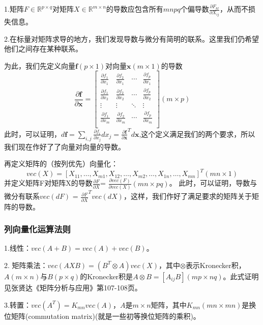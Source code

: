 \documentclass[UTF8]{ctexart}
\begin{document}
		1.矩阵$F\in \mathbb{R}^{p \times q}$对矩阵$X\in \mathbb{R}^{m \times n}$的导数应包含所有$mnpq$个偏导数$\frac{\partial F_{kl}}{\partial X_{ij}}$，从而不损失信息。

		2.在标量对矩阵求导的地方，我们发现导数与微分有简明的联系。这里我们仍希望他们之间存在某种联系。

		为此，我们先定义向量$\boldsymbol{f}(p×1)$对向量$\boldsymbol{x}(m×1)$的导数
		$$\frac{\partial \boldsymbol{f}}{\partial \boldsymbol{x}} 
		= 
		\begin{bmatrix} 
		\frac{\partial f_1}{\partial x_1} & \frac{\partial f_2}{\partial x_1} & \cdots & \frac{\partial f_p}{\partial x_1}\\ 
		\frac{\partial f_1}{\partial x_2} & \frac{\partial f_2}{\partial x_2} & \cdots & \frac{\partial f_p}{\partial x_2}\\ 
		\vdots & \vdots & \ddots & \vdots\\ 
		\frac{\partial f_1}{\partial x_m} & \frac{\partial f_2}{\partial x_m} & \cdots & \frac{\partial f_p}{\partial x_m}\\ 
		\end{bmatrix}(m×p)$$
		此时，可以证明，$d\boldsymbol{f} = \sum\limits_{i,j}\frac{\partial f_{i}}{\partial x_{j}} dx_{j} =
		\frac{\partial \boldsymbol{f} }{\partial \boldsymbol{x} }^T d\boldsymbol{x}$,这个定义满足我们的两个要求，所以我们现在作好了了向量对向量的导数。

		再定义矩阵的（按列优先）向量化：
		$${vec}(X) = [X_{11}, \ldots, X_{m1}, X_{12}, \ldots, X_{m2}, \ldots, X_{1n}, \ldots, X_{mn}]^T(mn×1)$$
		并定义矩阵F对矩阵X的导数$\frac{\partial F}{\partial X} $= $\frac{\partial {vec}(F)}{\partial {vec}(X)}(mn×pq)$。
		此时，可以证明，导数与微分有联系${vec}(dF)$ = $\frac{\partial F}{\partial X}^T {vec}(dX)$，这样，我们作好了满足要求的矩阵关于矩阵的导数。

		\subsubsection*{列向量化运算法则}

		1.线性：${vec}(A+B) = {vec}(A) + {vec}(B)$。
		
		2.{\color{red} 矩阵乘法}：${vec}(AXB) = (B^T \otimes A) {vec}(X)$，其中$\otimes$表示Kronecker积，$A(m×n)与B(p×q)$的Kronecker积是$A\otimes B = [A_{ij}B](mp×nq)$。此式证明见张贤达《矩阵分析与应用》第107-108页。
		
		3.转置：${vec}(A^T) = K_{mn}{vec}(A)$，$A$是$m×n$矩阵，其中$K_{mn}(mn×mn)$是换位矩阵(commutation matrix)(就是一些初等换位矩阵的乘积)。
\end{document}
